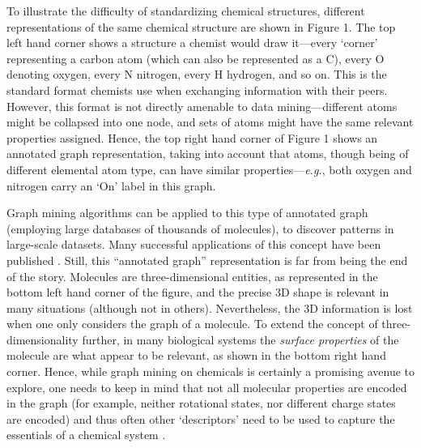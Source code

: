 \documentclass{sig-alternate}
\begin{document}
To illustrate the difficulty of standardizing chemical structures, different
representations of the same chemical structure are shown in Figure 1. The top
left hand corner shows a structure a chemist would draw it---every `corner'
representing a carbon atom (which can also be represented as a C), every O
denoting oxygen, every N nitrogen, every H hydrogen, and so on. This is the
standard format chemists use when exchanging information with their peers.
However, this format is not directly amenable to data mining---different atoms might
be collapsed into one node, and sets of atoms might have the same relevant
properties assigned. Hence, the top right hand corner of Figure 1 shows an
annotated graph representation, taking into account that atoms, though being of
different elemental atom type, can have similar properties---\emph{e.g.}, both oxygen
and nitrogen carry an `On' label in this graph.


Graph mining algorithms can be applied to this type of annotated graph
(employing large databases of thousands of molecules), to discover
patterns in large-scale datasets.  Many successful applications of
this concept have been published \cite{wegner2006,horst2009}. Still,
this ``annotated graph'' representation is far from being the end of
the story. Molecules are three-dimensional entities, as represented in
the bottom left hand corner of the figure, and the precise 3D shape is
relevant in many situations (although not in others).  Nevertheless, the
3D information is lost when one only considers the graph of a
molecule. To extend the concept of three-dimensionality further, in
many biological systems the \emph{surface properties} of the molecule
are what appear to be relevant, as shown in the bottom right hand
corner.  Hence, while graph mining on chemicals is certainly a
promising avenue to explore, one needs to keep in mind that not all
molecular properties are encoded in the graph (for example, neither
rotational states, nor different charge states are encoded) and thus
often other `descriptors' need to be used to capture the essentials of
a chemical system \cite{bender2004}.
\end{document}
